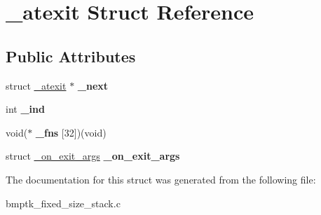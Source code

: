 \hypertarget{struct__atexit}{}\section{\+\_\+atexit Struct Reference}
\label{struct__atexit}
\subsection*{Public Attributes}
\begin{DoxyCompactItemize}
\item 
struct \hyperlink{struct__atexit}{\+\_\+atexit} $\ast$ {\bfseries \+\_\+next}\hypertarget{struct__atexit_a2397114c6fb2c1f789668c3cd502ee14}{}\label{struct__atexit_a2397114c6fb2c1f789668c3cd502ee14}

\item 
int {\bfseries \+\_\+ind}\hypertarget{struct__atexit_a635af92cf0a8901967cb179ffd9d26db}{}\label{struct__atexit_a635af92cf0a8901967cb179ffd9d26db}

\item 
void($\ast$ {\bfseries \+\_\+fns} \mbox{[}32\mbox{]})(void)\hypertarget{struct__atexit_a01b98b008ed0e60061538b34975f957a}{}\label{struct__atexit_a01b98b008ed0e60061538b34975f957a}

\item 
struct \hyperlink{struct__on__exit__args}{\+\_\+on\+\_\+exit\+\_\+args} {\bfseries \+\_\+on\+\_\+exit\+\_\+args}\hypertarget{struct__atexit_ab630385717bb5fa379f499cc11c3f2b5}{}\label{struct__atexit_ab630385717bb5fa379f499cc11c3f2b5}

\end{DoxyCompactItemize}


The documentation for this struct was generated from the following file\+:\begin{DoxyCompactItemize}
\item 
bmptk\+\_\+fixed\+\_\+size\+\_\+stack.\+c\end{DoxyCompactItemize}
